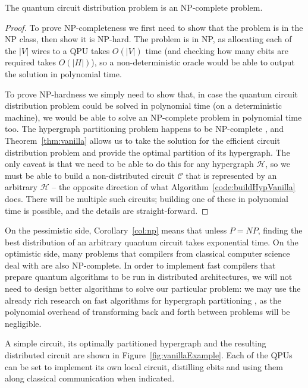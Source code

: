 \begin{corollary} The quantum circuit distribution problem is an NP-complete problem.
\label{col:np}
\end{corollary} \begin{proof}
To prove NP-completeness we first need to show that the problem is in the NP class, then show it is NP-hard. The problem is in NP, as allocating each of the \(|V|\) wires to a QPU takes \(O(|V|)\) time (and checking how many ebits are required takes \(O(|H|)\)), so a non-deterministic oracle would be able to output the solution in polynomial time. 

To prove NP-hardness we simply need to show that, in case the quantum circuit distribution problem could be solved in polynomial time (on a deterministic machine), we would be able to solve an NP-complete problem in polynomial time too. The hypergraph partitioning problem happens to be NP-complete \citep{NP-complete}, and Theorem~\ref{thm:vanilla} allows us to take the solution for the efficient circuit distribution problem and provide the optimal partition of its hypergraph. The only caveat is that we need to be able to do this for any hypergraph \(\mathcal{H}\), so we must be able to build a non-distributed circuit \(\mathcal{C}\) that is represented by an arbitrary \(\mathcal{H}\) -- the opposite direction of what Algorithm~\ref{code:buildHypVanilla} does. There will be multiple such circuits; building one of these in polynomial time is possible, and the details are straight-forward.

\end{proof}

On the pessimistic side, Corollary~\ref{col:np} means that unless \(P=NP\), finding the best distribution of an arbitrary quantum circuit takes exponential time. On the optimistic side, many problems that compilers from classical computer science deal with are also NP-complete. In order to implement fast compilers that prepare quantum algorithms to be run in distributed architectures, we will not need to design better algorithms to solve our particular problem: we may use the already rich research on fast algorithms for hypergraph partitioning \citep{KaHyPar}, as the polynomial overhead of transforming back and forth between problems will be negligible.



A simple circuit, its optimally partitioned hypergraph and the resulting distributed circuit are shown in Figure~\ref{fig:vanillaExample}. Each of the QPUs can be set to implement its own local circuit, distilling ebits and using them along classical communication when indicated.


